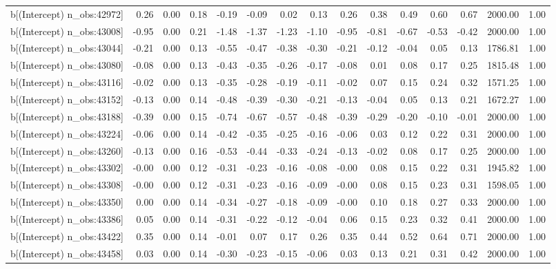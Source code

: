 \begin{table}[ht]
\begin{tabular}{rrrrrrrrrrrrrrr}
  b[(Intercept) n\_obs:42972] & 0.26 & 0.00 & 0.18 & -0.19 & -0.09 & 0.02 & 0.13 & 0.26 & 0.38 & 0.49 & 0.60 & 0.67 & 2000.00 & 1.00 \\ 
  b[(Intercept) n\_obs:43008] & -0.95 & 0.00 & 0.21 & -1.48 & -1.37 & -1.23 & -1.10 & -0.95 & -0.81 & -0.67 & -0.53 & -0.42 & 2000.00 & 1.00 \\ 
  b[(Intercept) n\_obs:43044] & -0.21 & 0.00 & 0.13 & -0.55 & -0.47 & -0.38 & -0.30 & -0.21 & -0.12 & -0.04 & 0.05 & 0.13 & 1786.81 & 1.00 \\ 
  b[(Intercept) n\_obs:43080] & -0.08 & 0.00 & 0.13 & -0.43 & -0.35 & -0.26 & -0.17 & -0.08 & 0.01 & 0.08 & 0.17 & 0.25 & 1815.48 & 1.00 \\ 
  b[(Intercept) n\_obs:43116] & -0.02 & 0.00 & 0.13 & -0.35 & -0.28 & -0.19 & -0.11 & -0.02 & 0.07 & 0.15 & 0.24 & 0.32 & 1571.25 & 1.00 \\ 
  b[(Intercept) n\_obs:43152] & -0.13 & 0.00 & 0.14 & -0.48 & -0.39 & -0.30 & -0.21 & -0.13 & -0.04 & 0.05 & 0.13 & 0.21 & 1672.27 & 1.00 \\ 
  b[(Intercept) n\_obs:43188] & -0.39 & 0.00 & 0.15 & -0.74 & -0.67 & -0.57 & -0.48 & -0.39 & -0.29 & -0.20 & -0.10 & -0.01 & 2000.00 & 1.00 \\ 
  b[(Intercept) n\_obs:43224] & -0.06 & 0.00 & 0.14 & -0.42 & -0.35 & -0.25 & -0.16 & -0.06 & 0.03 & 0.12 & 0.22 & 0.31 & 2000.00 & 1.00 \\ 
  b[(Intercept) n\_obs:43260] & -0.13 & 0.00 & 0.16 & -0.53 & -0.44 & -0.33 & -0.24 & -0.13 & -0.02 & 0.08 & 0.17 & 0.25 & 2000.00 & 1.00 \\ 
  b[(Intercept) n\_obs:43302] & -0.00 & 0.00 & 0.12 & -0.31 & -0.23 & -0.16 & -0.08 & -0.00 & 0.08 & 0.15 & 0.22 & 0.31 & 1945.82 & 1.00 \\ 
  b[(Intercept) n\_obs:43308] & -0.00 & 0.00 & 0.12 & -0.31 & -0.23 & -0.16 & -0.09 & -0.00 & 0.08 & 0.15 & 0.23 & 0.31 & 1598.05 & 1.00 \\ 
  b[(Intercept) n\_obs:43350] & 0.00 & 0.00 & 0.14 & -0.34 & -0.27 & -0.18 & -0.09 & -0.00 & 0.10 & 0.18 & 0.27 & 0.33 & 2000.00 & 1.00 \\ 
  b[(Intercept) n\_obs:43386] & 0.05 & 0.00 & 0.14 & -0.31 & -0.22 & -0.12 & -0.04 & 0.06 & 0.15 & 0.23 & 0.32 & 0.41 & 2000.00 & 1.00 \\ 
  b[(Intercept) n\_obs:43422] & 0.35 & 0.00 & 0.14 & -0.01 & 0.07 & 0.17 & 0.26 & 0.35 & 0.44 & 0.52 & 0.64 & 0.71 & 2000.00 & 1.00 \\ 
  b[(Intercept) n\_obs:43458] & 0.03 & 0.00 & 0.14 & -0.30 & -0.23 & -0.15 & -0.06 & 0.03 & 0.13 & 0.21 & 0.31 & 0.42 & 2000.00 & 1.00 \\ 

\end{tabular}
\end{table}
